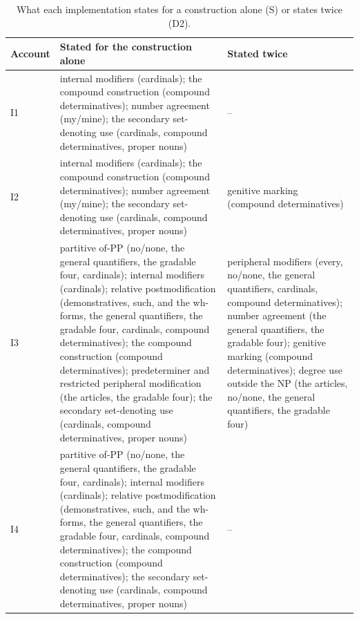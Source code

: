 \begin{table}[H]\centering\small
\caption{What each implementation states for a construction alone (S) or states twice (D2).}\label{tab:stip}
\begin{tabular}{>{\raggedright\arraybackslash}p{1.6cm}>{\raggedright\arraybackslash}p{6.5cm}>{\raggedright\arraybackslash}p{6.1cm}}
\toprule
Account & Stated for the construction alone & Stated twice \\
\midrule
I1 & internal modifiers (cardinals); the compound construction (compound determinatives); number agreement (my/mine); the secondary set-denoting use (cardinals, compound determinatives, proper nouns) & -- \\
I2 & internal modifiers (cardinals); the compound construction (compound determinatives); number agreement (my/mine); the secondary set-denoting use (cardinals, compound determinatives, proper nouns) & genitive marking (compound determinatives) \\
I3 & partitive of-PP (no/none, the general quantifiers, the gradable four, cardinals); internal modifiers (cardinals); relative postmodification (demonstratives, such, and the wh-forms, the general quantifiers, the gradable four, cardinals, compound determinatives); the compound construction (compound determinatives); predeterminer and restricted peripheral modification (the articles, the gradable four); the secondary set-denoting use (cardinals, compound determinatives, proper nouns) & peripheral modifiers (every, no/none, the general quantifiers, cardinals, compound determinatives); number agreement (the general quantifiers, the gradable four); genitive marking (compound determinatives); degree use outside the NP (the articles, no/none, the general quantifiers, the gradable four) \\
I4 & partitive of-PP (no/none, the general quantifiers, the gradable four, cardinals); internal modifiers (cardinals); relative postmodification (demonstratives, such, and the wh-forms, the general quantifiers, the gradable four, cardinals, compound determinatives); the compound construction (compound determinatives); the secondary set-denoting use (cardinals, compound determinatives, proper nouns) & -- \\
\bottomrule
\end{tabular}
\end{table}

